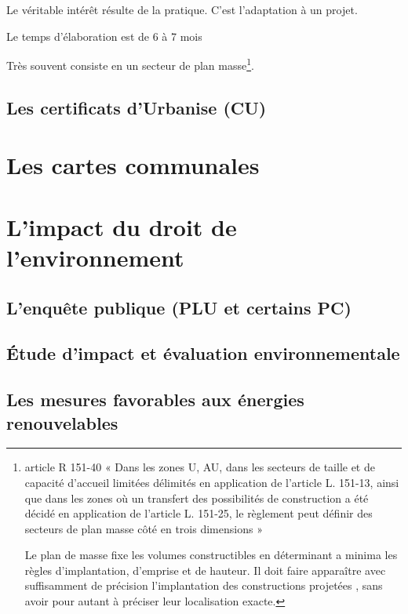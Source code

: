 		 		Le véritable intérêt résulte de la pratique. C'est l'adaptation à un projet.

		 		Le temps d'élaboration est de 6 à 7 mois

		 		Très souvent consiste en un secteur de plan masse\footnote{
		 			article R 151-40 « Dans les zones U, AU,
		 			dans les secteurs de taille et de capacité d'accueil limitées délimités en application de
		 			l'article L. 151-13, ainsi que dans les zones où un transfert des possibilités de construction a
		 			été décidé en application de l'article L. 151-25, le règlement peut définir des secteurs de plan
		 			masse côté en trois dimensions »

			 		Le plan de masse fixe les volumes constructibles en déterminant a minima les règles
			 		d’implantation, d’emprise et de hauteur. Il doit faire apparaître avec suffisamment de
			 		précision l’implantation des constructions projetées
			 		, sans avoir pour autant à préciser leur
			 		localisation exacte.
		 		}.

	\subsection{Les certificats d'Urbanise (CU)}

\section{Les cartes communales}

\section{L'impact du droit de l'environnement}

	\subsection{L'enquête publique (PLU et certains PC)}

	\subsection{Étude d'impact et évaluation environnementale}

	\subsection{Les mesures favorables aux énergies renouvelables}
